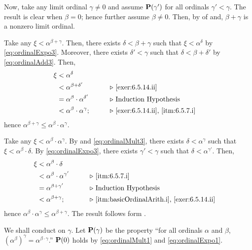 \documentclass[../introduction_to_set_theory_Note.tex]{subfiles}
\begin{document}
{\begin{enumerate}[nolistsep, label=(\roman*), leftmargin=*, listparindent=\parindent]
    Now, take any limit ordinal \(\gamma \neq 0\) and assume
    \(\bm{\mathrm{P}}(\gamma')\) for all ordinals \(\gamma' < \gamma\).
    The result is clear when \(\beta = 0\); hence further assume \(\beta \neq 0\).
    Then, by  of  and, \(\beta + \gamma\)
    is a nonzero limit ordinal.

    Take any \(\xi < \alpha^{\beta + \gamma}\).
    Then, there exists \(\delta < \beta + \gamma\) such that
    \(\xi < \alpha^\delta\) by \eqref{eq:ordinalExpo3}.
    Moreover, there exists \(\delta' < \gamma\) such that
    \(\delta < \beta + \delta'\) by \eqref{eq:ordinalAdd3}.
    Then,
    \begin{alignat*}{2}
        \xi
        &< \alpha^\delta &\qquad \\
        &< \alpha^{\beta + \delta'} &\qquad& \comment*{\ref{exer:6.5.14.ii}} \\
        &= \alpha^\beta \cdot \alpha^{\delta'} && \comment*{Induction Hypothesis} \\
        &< \alpha^\beta \cdot \alpha^\gamma; && \comment*{\ref{exer:6.5.14.ii}, \ref{itm:6.5.7.i}}
    \end{alignat*}
    hence \(\alpha^{\beta + \gamma} \le \alpha^\beta \cdot \alpha^\gamma\).

    Take any \(\xi < \alpha^\beta \cdot \alpha^\gamma\).
    By  and \eqref{eq:ordinalMult3},
    there exists \(\delta < \alpha^\gamma\) such that \(\xi < \alpha^\beta \cdot \delta\).
    By \eqref{eq:ordinalExpo3}, there exists \(\gamma' < \gamma\) such that \(\delta < \alpha^{\gamma'}\).
    Then,
    \begin{alignat*}{2}
        \xi
        &< \alpha^\beta \cdot \delta &\qquad \\
        &< \alpha^\beta \cdot \alpha^{\gamma'} && \comment*{\ref{itm:6.5.7.i}} \\
        &= \alpha^{\beta + \gamma'} && \comment*{Induction Hypothesis} \\
        &< \alpha^{\beta + \gamma}; && \comment*{\ref{itm:basicOrdinalArith.i}, \ref{exer:6.5.14.ii}}
    \end{alignat*}
    hence \(\alpha^\beta \cdot \alpha^\gamma \le \alpha^{\beta + \gamma}\).
    The result follows form .

    \ii
    We shall conduct  on \(\gamma\).
    Let \(\bm{\mathrm{P}}(\gamma)\) be the property
    ``for all ordinals \(\alpha\) and \(\beta\), \((\alpha^\beta)^\gamma = \alpha^{\beta \cdot \gamma}\).''
    \(\bm{\mathrm{P}}(0)\) holds by \eqref{eq:ordinalMult1} and \eqref{eq:ordinalExpo1}.


\end{enumerate}}
\end{document}
